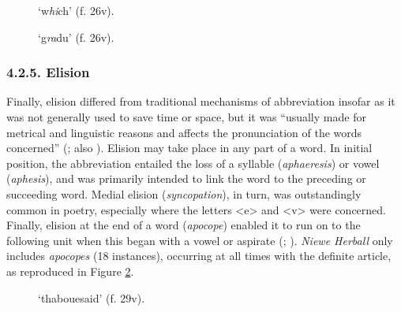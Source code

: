 \begin{paper}
\begin{figure}[H]
  \centering
  \begin{minipage}[b]{0.36\textwidth}
    \caption{`w\emph{hi}ch' (f. 26v).}
    \label{fig:lorente42}
  \end{minipage}
  \hfill
  \begin{minipage}[b]{0.36\textwidth}
    \caption{`g\emph{ra}du' (f.
26v).\protect \footnotemark}
    \label{fig:lorente43}
  \end{minipage}
\end{figure}

\subsubsection{4.2.5. Elision}

Finally, elision differed from traditional mechanisms of abbreviation
insofar as it was not generally used to save time or space, but it
was ``usually made for metrical and linguistic reasons and affects the
pronunciation of the words concerned'' (\cite[121]{tannenbaum_handwriting_1930}; also \cite[25]{petti_english_1977}). Elision may take place in any part of a word. In initial
position, the abbreviation entailed the loss of a syllable (\emph{aphaeresis}) or vowel (\emph{aphesis}), and was primarily
intended to link the word to the preceding or succeeding word. Medial
elision (\emph{syncopation}), in turn, was outstandingly common in
poetry, especially where the letters \textless e\textgreater{} and
\textless v\textgreater{} were concerned. Finally, elision at the end of
a word (\emph{apocope}) enabled it to run on to the following unit
when this began with a vowel or aspirate (\cite[121--124]{tannenbaum_handwriting_1930};
\cite[25]{petti_english_1977}). \emph{Niewe Herball} only includes \emph{apocopes} (18
instances), occurring at all times with the definite article, as
reproduced in Figure \ref{fig:lorente44}.

\begin{figure}[H]
  \centering
    \caption{`thabouesaid' (f. 29v).}
    \label{fig:lorente44}
    \end{figure}


\end{paper}
